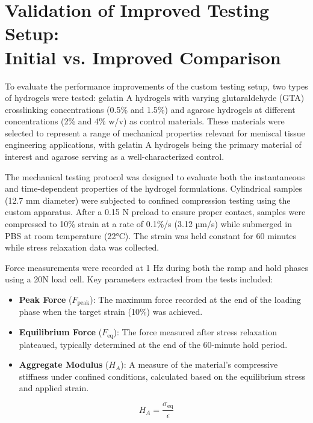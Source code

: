 \clearpage
\section{Validation of Improved Testing Setup:\protect\\Initial vs. Improved Comparison}

To evaluate the performance improvements of the custom testing setup, two types of hydrogels were tested: gelatin A hydrogels with varying glutaraldehyde (GTA) crosslinking concentrations (0.5\% and 1.5\%) and agarose hydrogels at different concentrations (2\% and 4\% w/v) as control materials. These materials were selected to represent a range of mechanical properties relevant for meniscal tissue engineering applications, with gelatin A hydrogels being the primary material of interest and agarose serving as a well-characterized control.

The mechanical testing protocol was designed to evaluate both the instantaneous and time-dependent properties of the hydrogel formulations. Cylindrical samples (12.7 mm diameter) were subjected to confined compression testing using the custom apparatus. After a 0.15 N preload to ensure proper contact, samples were compressed to 10\% strain at a rate of 0.1\%/s (3.12 µm/s) while submerged in PBS at room temperature (22°C). The strain was held constant for 60 minutes while stress relaxation data was collected.

Force measurements were recorded at 1 Hz during both the ramp and hold phases using a 20N load cell. Key parameters extracted from the tests included:

\begin{itemize}
    \item \textbf{Peak Force} (\(F_{\text{peak}}\)): The maximum force recorded at the end of the loading phase when the target strain (10\%) was achieved.
    
    \item \textbf{Equilibrium Force} (\(F_{\text{eq}}\)): The force measured after stress relaxation plateaued, typically determined at the end of the 60-minute hold period.
    
    \item \textbf{Aggregate Modulus} (\(H_A\)): A measure of the material's compressive stiffness under confined conditions, calculated based on the equilibrium stress and applied strain.
\end{itemize}

\begin{equation}
    H_A = \frac{\sigma_{\text{eq}}}{\epsilon}
\end{equation}


